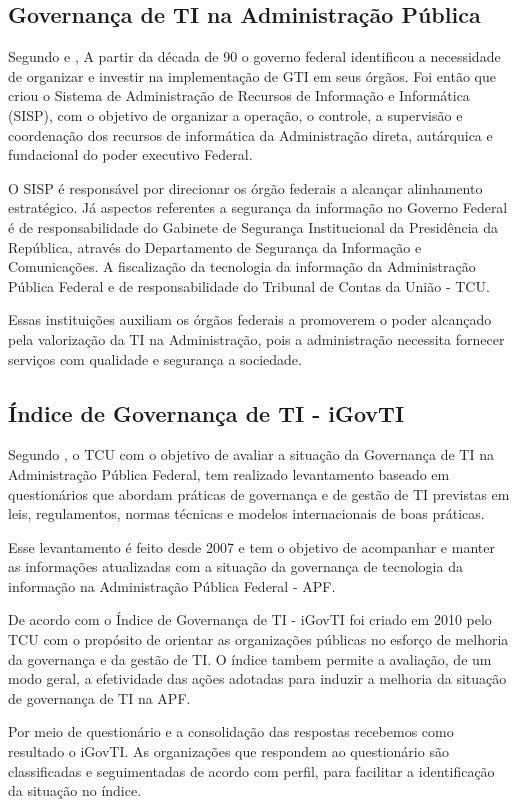 \subsection{Governança de TI na Administração Pública}

Segundo \cite{ImplantandoGTI:2012} e \cite{SISP} , A partir da década de 90 o governo federal identificou a necessidade de organizar e investir na implementação de GTI em seus órgãos. Foi então que criou o Sistema de Administração de Recursos de Informação e Informática (SISP), com o objetivo de organizar a operação, o controle, a supervisão e coordenação dos recursos de informática da Administração direta, autárquica e fundacional do poder executivo Federal. 

O SISP é responsável por direcionar os órgão federais a alcançar alinhamento estratégico. Já aspectos referentes a segurança da informação no Governo Federal é de responsabilidade do Gabinete de Segurança Institucional da  Presidência da República, através do Departamento de Segurança da Informação e Comunicações. A fiscalização da tecnologia da informação da Administração Pública Federal e de responsabilidade do Tribunal de Contas da União - TCU.

Essas instituições auxiliam os órgãos federais a promoverem o poder alcançado pela valorização da TI na Administração, pois a administração necessita fornecer serviços com qualidade e segurança a sociedade. 

\subsection{Índice de Governança de TI - iGovTI}\label{subsec:iGovTI}

Segundo \cite{acordaoTCU}, o TCU com o objetivo de avaliar a situação da Governança de TI na Administração Pública Federal, tem realizado levantamento baseado em questionários que abordam práticas de governança e de gestão de TI previstas em leis, regulamentos, normas técnicas e modelos internacionais de boas práticas. 

Esse levantamento é feito desde 2007 e tem o objetivo de acompanhar e manter as informações atualizadas com a situação da governança de tecnologia da informação na Administração Pública Federal - APF.
 
De acordo com \cite{acordaoTCU} o Índice de Governança de TI - iGovTI foi criado em 2010 pelo TCU com o propósito de orientar as organizações públicas no esforço de melhoria da governança e da gestão de TI. O índice tambem permite a avaliação, de um modo geral, a efetividade das ações adotadas para induzir a melhoria da situação de governança de TI na APF.   

Por meio de questionário e a consolidação das respostas recebemos como resultado o iGovTI. As organizações que respondem ao questionário são classificadas e seguimentadas de acordo com perfil, para facilitar a identificação da situação no índice.